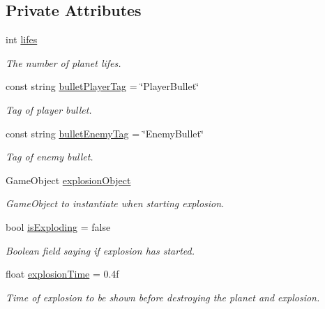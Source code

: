 \subsection*{Private Attributes}
\begin{DoxyCompactItemize}
\item 
int \mbox{\hyperlink{class_planet_lifes_controller_aed3eda19d1b309c060e3767e5b59229b}{lifes}}
\begin{DoxyCompactList}\small\item\em The number of planet lifes. \end{DoxyCompactList}\item 
const string \mbox{\hyperlink{class_planet_lifes_controller_add5be50a0a3b78336783917e645f3c37}{bullet\+Player\+Tag}} = \char`\"{}Player\+Bullet\char`\"{}
\begin{DoxyCompactList}\small\item\em Tag of player bullet. \end{DoxyCompactList}\item 
const string \mbox{\hyperlink{class_planet_lifes_controller_a4c79c7ef6c7bb366c46c92acb23ac61e}{bullet\+Enemy\+Tag}} = \char`\"{}Enemy\+Bullet\char`\"{}
\begin{DoxyCompactList}\small\item\em Tag of enemy bullet. \end{DoxyCompactList}\item 
Game\+Object \mbox{\hyperlink{class_planet_lifes_controller_ae1d5ca2179fee61576c0ccb7e1266431}{explosion\+Object}}
\begin{DoxyCompactList}\small\item\em Game\+Object to instantiate when starting explosion. \end{DoxyCompactList}\item 
bool \mbox{\hyperlink{class_planet_lifes_controller_a1a5b00ecd3e79fcceaa6df9ab991dab1}{is\+Exploding}} = false
\begin{DoxyCompactList}\small\item\em Boolean field saying if explosion has started. \end{DoxyCompactList}\item 
float \mbox{\hyperlink{class_planet_lifes_controller_aaa578effa135cea6a3d046943d81180e}{explosion\+Time}} = 0.\+4f
\begin{DoxyCompactList}\small\item\em Time of explosion to be shown before destroying the planet and explosion. \end{DoxyCompactList}\item 

\end{DoxyCompactItemize}
